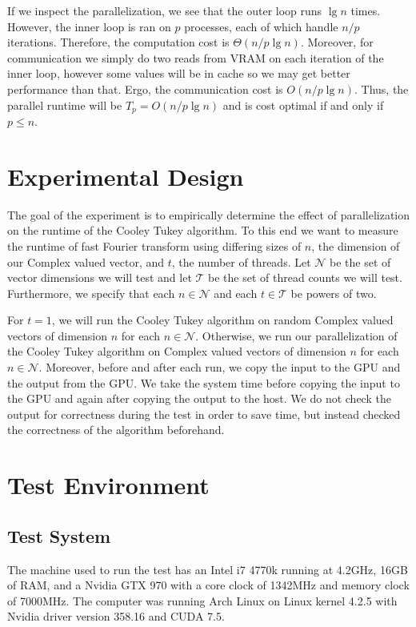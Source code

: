 \documentclass[notitlepage, twocolumn]{article}
\begin{document}
If we inspect the parallelization, we see that the outer loop runs $\lg n$ times.
However, the inner loop is ran on $p$ processes, each of which handle $n/p$ iterations.
Therefore, the computation cost is $\Theta(n/p\lg n)$.
Moreover, for communication we simply do two reads from VRAM on each iteration of the inner loop, however some values will be in cache so we may get better performance than that.
Ergo, the communication cost is $O(n/p\lg n)$.
Thus, the parallel runtime will be $T_p = O(n/p \lg n)$ and is cost optimal if and only if $p\leq n$.

\section{Experimental Design}

The goal of the experiment is to empirically determine the effect of parallelization on the runtime of the Cooley Tukey algorithm.
To this end we want to measure the runtime of fast Fourier transform using differing sizes of $n$, the dimension of our Complex valued vector, and $t$, the number of threads.
Let $\mathcal{N}$ be the set of vector dimensions we will test and let $\mathcal{T}$ be the set of thread counts we will test.
Furthermore, we specify that each $n\in\mathcal{N}$ and each $t\in\mathcal{T}$ be powers of two.

For $t=1$, we will run the Cooley Tukey algorithm on random Complex valued vectors of dimension $n$ for each $n\in\mathcal{N}$.
Otherwise, we run our parallelization of the Cooley Tukey algorithm on Complex valued vectors of dimension $n$ for each $n\in\mathcal{N}$.
Moreover, before and after each run, we copy the input to the GPU and the output from the GPU.
We take the system time before copying the input to the GPU and again after copying the output to the host.
We do not check the output for correctness during the test in order to save time, but instead checked the correctness of the algorithm beforehand.

\section{Test Environment}

\subsection{Test System}

The machine used to run the test has an Intel i7 4770k running at 4.2GHz, 16GB of RAM, and a Nvidia GTX 970 with a core clock of 1342MHz and memory clock of 7000MHz.
The computer was running Arch Linux on Linux kernel 4.2.5 with Nvidia driver version 358.16 and CUDA 7.5.
\end{document}
